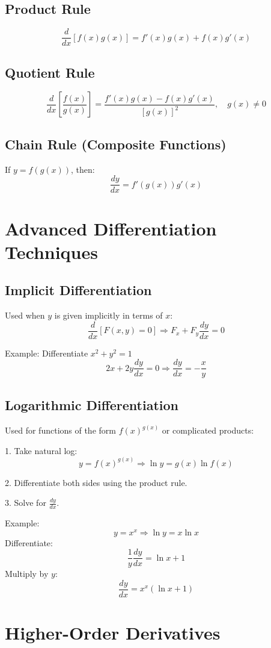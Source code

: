 \documentclass{article}
\begin{document}
\subsection{Product Rule}
\[
\frac{d}{dx} [f(x) g(x)] = f'(x) g(x) + f(x) g'(x)
\]
\subsection{Quotient Rule}
\[
\frac{d}{dx} \left[\frac{f(x)}{g(x)}\right] = \frac{f'(x)g(x) - f(x)g'(x)}{[g(x)]^2}, \quad g(x) \neq 0
\]
\subsection{Chain Rule (Composite Functions)}
If \( y = f(g(x)) \), then:
\[
\frac{dy}{dx} = f'(g(x)) g'(x)
\]
\newpage
\section{Advanced Differentiation Techniques}

\subsection{Implicit Differentiation}

Used when \( y \) is given implicitly in terms of \( x \):  
\[
\frac{d}{dx} [F(x, y) = 0] \Rightarrow F_x + F_y \frac{dy}{dx} = 0
\]

Example: Differentiate \( x^2 + y^2 = 1 \)  
\[
2x + 2y \frac{dy}{dx} = 0 \Rightarrow \frac{dy}{dx} = -\frac{x}{y}
\]

\subsection{Logarithmic Differentiation}

Used for functions of the form \( f(x)^{g(x)} \) or complicated products:

1. Take natural log:  
   \[
   y = f(x)^{g(x)} \Rightarrow \ln y = g(x) \ln f(x)
   \]

2. Differentiate both sides using the product rule.

3. Solve for \( \frac{dy}{dx} \).

Example:
\[
y = x^x \Rightarrow \ln y = x \ln x
\]
Differentiate:
\[
\frac{1}{y} \frac{dy}{dx} = \ln x + 1
\]
Multiply by \( y \):
\[
\frac{dy}{dx} = x^x (\ln x + 1)
\]

\newpage
\section{Higher-Order Derivatives}
 
\end{document}
